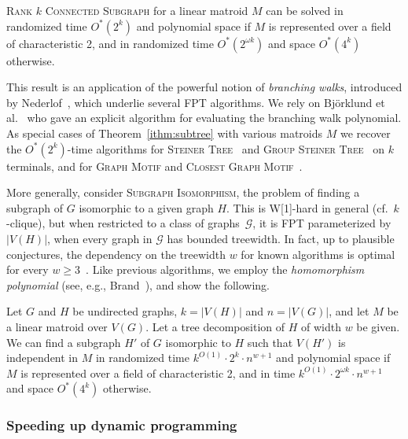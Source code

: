 \documentclass{theoretics}
\begin{document}
\begin{theorem} \label{ithm:subtree}
  \textsc{Rank $k$ Connected Subgraph} for a linear matroid $M$
  can be solved in randomized time $O^*(2^k)$ and polynomial space
  if $M$ is represented over a field of characteristic 2,
  and in randomized time $O^*(2^{\omega k})$ and space $O^*(4^k)$
  otherwise.
\end{theorem}

This result is an application of the powerful notion of \emph{branching walks},
introduced by Nederlof~\cite{Nederlof13algorithmica}, which underlie several FPT algorithms.
We rely on Björklund et al.~\cite{BjorklundKK16} who gave an explicit algorithm for
evaluating the branching walk polynomial.
As special cases of Theorem~\ref{ithm:subtree} with various matroids $M$
we recover the $O^*(2^k)$-time algorithms for
\textsc{Steiner Tree}~\cite{Nederlof13algorithmica} and
\textsc{Group Steiner Tree}~\cite{MisraPRSS12} on $k$ terminals,
and for \textsc{Graph Motif} and \textsc{Closest Graph Motif}~\cite{BjorklundKK16}.

More generally, consider \textsc{Subgraph Isomorphism}, the problem of finding a subgraph of $G$
isomorphic to a given graph $H$. This is W[1]-hard in general
(cf.~$k$-clique), but when restricted to a class of graphs~$\mathcal{G}$, it is FPT parameterized by $|V(H)|$, when every graph in $\mathcal{G}$ has bounded treewidth. 
In fact, up to plausible conjectures, the dependency on the treewidth $w$ for known algorithms
is optimal for every $w \geq 3$~\cite{BringmannS21}.
Like previous algorithms, we employ the \emph{homomorphism polynomial}
(see, e.g., Brand~\cite{Brand19thesis}), and show the following.

\begin{theorem} \label{ithm:subgraph-iso}
  Let $G$ and $H$ be undirected graphs, $k=|V(H)|$ and $n=|V(G)|$,
  and let $M$ be a linear matroid over $V(G)$. Let a tree decomposition
  of $H$ of width $w$ be given.
  We can find a subgraph $H'$ of $G$ isomorphic to $H$
  such that $V(H')$ is independent in $M$ 
  in randomized time $k^{O(1)} \cdot 2^k \cdot n^{w+1}$ and polynomial space
  if $M$ is represented over a field of characteristic 2,
  and in time $k^{O(1)} \cdot 2^{\omega k} \cdot n^{w+1}$ and space $O^*(4^k)$
  otherwise. 
\end{theorem}


\subsubsection{Speeding up dynamic programming}
\label{sec:intro-noDP}
\end{document}
